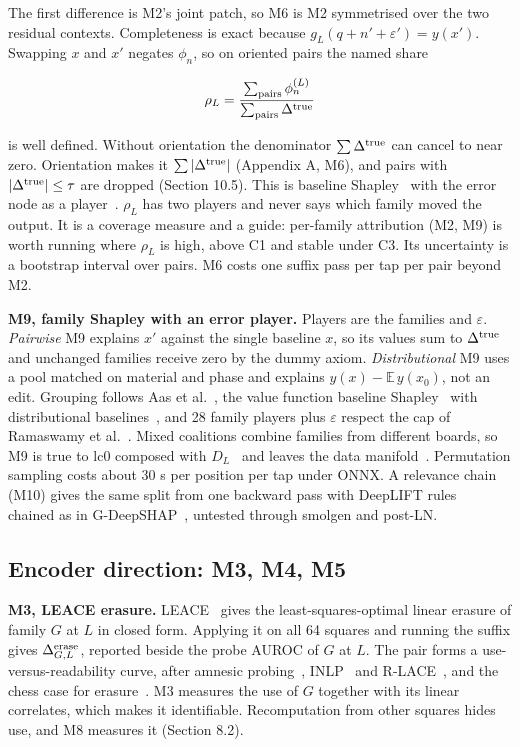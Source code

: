 \documentclass[conference]{IEEEtran}
\begin{document}
The first difference is M2's joint patch, so M6 is M2 symmetrised over the two residual contexts. Completeness is exact because $g_L(q+n'+\varepsilon')=y(x')$. Swapping $x$ and $x'$ negates $\phi_n$, so on oriented pairs the named share

\[
\rho_L=\frac{\sum_{\rm pairs}\phi^{(L)}_n}{\sum_{\rm pairs}\Delta^{\rm true}}
\]

is well defined. Without orientation the denominator $\sum\Delta^{\rm true}$ can cancel to near zero. Orientation makes it $\sum|\Delta^{\rm true}|$ (Appendix A, M6), and pairs with $|\Delta^{\rm true}|\le\tau$ are dropped (Section 10.5). This is baseline Shapley~\cite{sundararajan2020} with the error node as a player~\cite{marks2025}. $\rho_L$ has two players and never says which family moved the output. It is a coverage measure and a guide: per-family attribution (M2, M9) is worth running where $\rho_L$ is high, above C1 and stable under C3. Its uncertainty is a bootstrap interval over pairs. M6 costs one suffix pass per tap per pair beyond M2.

\textbf{M9, family Shapley with an error player.} Players are the families and $\varepsilon$. \emph{Pairwise} M9 explains $x'$ against the single baseline $x$, so its values sum to $\Delta^{\rm true}$ and unchanged families receive zero by the dummy axiom. \emph{Distributional} M9 uses a pool matched on material and phase and explains $y(x)-\mathbb E\,y(x_0)$, not an edit. Grouping follows Aas et al.~\cite{aas2021}, the value function baseline Shapley~\cite{sundararajan2020} with distributional baselines~\cite{lundstrom2022}, and 28 family players plus $\varepsilon$ respect the cap of Ramaswamy et al.~\cite{ramaswamy2023}. Mixed coalitions combine families from different boards, so M9 is true to lc0 composed with $D_L$~\cite{chen2020} and leaves the data manifold~\cite{kumarIE2020}. Permutation sampling costs about 30 s per position per tap under ONNX. A relevance chain (M10) gives the same split from one backward pass with DeepLIFT rules~\cite{shrikumar2017} chained as in G-DeepSHAP~\cite{chen2022}, untested through smolgen and post-LN.

\subsection{Encoder direction: M3, M4, M5}\label{sec:7.3}
\textbf{M3, LEACE erasure.} LEACE~\cite{belrose2023} gives the least-squares-optimal linear erasure of family $G$ at $L$ in closed form. Applying it on all 64 squares and running the suffix gives $\Delta^{\rm erase}_{G,L}$, reported beside the probe AUROC of $G$ at $L$. The pair forms a use-versus-readability curve, after amnesic probing~\cite{elazar2021}, INLP~\cite{ravfogel2020} and R-LACE~\cite{ravfogel2022}, and the chess case for erasure~\cite{palsson2024}. M3 measures the use of $G$ together with its linear correlates, which makes it identifiable. Recomputation from other squares hides use, and M8 measures it (Section 8.2).
\end{document}
